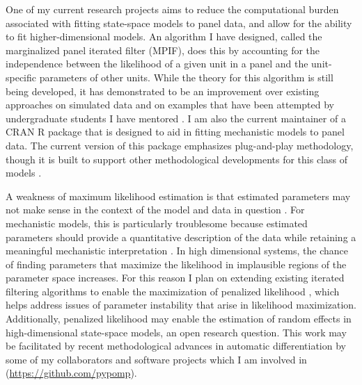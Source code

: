 \documentclass{article}
\begin{document}
One of my current research projects aims to reduce the computational burden associated with fitting state-space models to panel data, and allow for the ability to fit higher-dimensional models.
An algorithm I have designed, called the marginalized panel iterated filter (MPIF), does this by accounting for the independence between the likelihood of a given unit in a panel and the unit-specific parameters of other units.
While the theory for this algorithm is still being developed, it has demonstrated to be an improvement over existing approaches on simulated data and on examples that have been attempted by undergraduate students I have mentored \cite{yang23,sun24}.
I am also the current maintainer of a CRAN R package that is designed to aid in fitting mechanistic models to panel data.
The current version of this package emphasizes plug-and-play methodology, though it is built to support other methodological developments for this class of models \cite{panelpomp}.

A weakness of maximum likelihood estimation is that estimated parameters may not make sense in the context of the model and data in question \cite{lecam90}.
For mechanistic models, this is particularly troublesome because estimated parameters should provide a quantitative description of the data while retaining a meaningful mechanistic interpretation \cite{wheeler24}.
In high dimensional systems, the chance of finding parameters that maximize the likelihood in implausible regions of the parameter space increases.
For this reason I plan on extending existing iterated filtering algorithms \cite{ionides15,ionides22} to enable the maximization of penalized likelihood \cite{cole13}, which helps address issues of parameter instability that arise in likelihood maximization.
Additionally, penalized likelihood may enable the estimation of random effects in high-dimensional state-space models, an open research question.
This work may be facilitated by recent methodological advances in automatic differentiation by some of my collaborators \cite{tan24} and software projects which I am involved in (\url{https://github.com/pypomp}).

\end{document}
